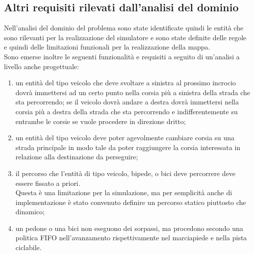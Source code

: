 \subsection{Altri requisiti rilevati dall'analisi del dominio}
Nell'analisi del dominio del problema sono state identificate quindi le entità che sono rilevanti per la realizzazione del simulatore e sono state definite delle regole e quindi delle limitazioni funzionali per la realizzazione della mappa. \\
Sono emerse inoltre le seguenti funzionalità e requisiti a seguito di un'analisi a livello anche progettuale:
\begin{enumerate}
\item un entità del tipo veicolo che deve svoltare a sinistra al prossimo incrocio dovrà immettersi ad un certo punto nella corsia più a sinistra della strada che sta percorrendo; se il veicolo dovrà andare a destra dovrà immettersi nella corsia più a destra della strada che sta percorrendo e indifferentemente su entrambe le corsie se vuole procedere in direzione dritto;
\item un entità del tipo veicolo deve poter agevolmente cambiare corsia su una strada principale in modo tale da poter raggiungere la corsia interessata in relazione alla destinazione da perseguire;
\item il percorso che l'entità di tipo veicolo, bipede, o bici deve percorrere deve essere fissato a priori. \\
Questa è una limitazione per la simulazione, ma per semplicità anche di implementazione è stato convenuto definire un percorso statico piuttosto che dinamico;
\item un pedone o una bici non eseguono dei sorpassi, ma procedono secondo una politica FIFO nell'avanzamento rispettivamente nel marciapiede e nella pista ciclabile. 
\end{enumerate}

\newpage


